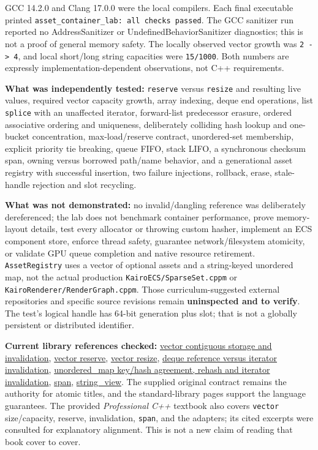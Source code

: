 GCC 14.2.0 and Clang 17.0.0 were the local compilers. Each final executable printed \texttt{asset\_container\_lab:\ all\ checks\ passed}. The GCC sanitizer run reported no AddressSanitizer or UndefinedBehaviorSanitizer diagnostics; this is not a proof of general memory safety. The locally observed vector growth was \texttt{2\ -\textgreater{}\ 4}, and local short/long string capacities were \texttt{15/1000}. Both numbers are expressly implementation-dependent observations, not C++ requirements.

\textbf{What was independently tested:} \texttt{reserve} versus \texttt{resize} and resulting live values, required vector capacity growth, array indexing, deque end operations, list \texttt{splice} with an unaffected iterator, forward-list predecessor erasure, ordered associative ordering and uniqueness, deliberately colliding hash lookup and one-bucket concentration, max-load/reserve contract, unordered-set membership, explicit priority tie breaking, queue FIFO, stack LIFO, a synchronous checksum span, owning versus borrowed path/name behavior, and a generational asset registry with successful insertion, two failure injections, rollback, erase, stale-handle rejection and slot recycling.

\textbf{What was not demonstrated:} no invalid/dangling reference was deliberately dereferenced; the lab does not benchmark container performance, prove memory-layout details, test every allocator or throwing custom hasher, implement an ECS component store, enforce thread safety, guarantee network/filesystem atomicity, or validate GPU queue completion and native resource retirement. \texttt{AssetRegistry} uses a vector of optional assets and a string-keyed unordered map, not the actual production \texttt{KairoECS/SparseSet.cppm} or \texttt{KairoRenderer/RenderGraph.cppm}. Those curriculum-suggested external repositories and specific source revisions remain \textbf{uninspected and to verify}. The test's logical handle has 64-bit generation plus slot; that is not a globally persistent or distributed identifier.

\textbf{Current library references checked:} \href{https://en.cppreference.com/w/cpp/container/vector}{vector contiguous storage and invalidation}, \href{https://www.cppreference.com/cpp/container/vector/reserve}{vector reserve}, \href{https://www.cppreference.com/cpp/container/vector/resize}{vector resize}, \href{https://en.cppreference.com/w/cpp/container/deque}{deque reference versus iterator invalidation}, \href{https://en.cppreference.com/cpp/container/unordered_map}{unordered\_map key/hash agreement, rehash and iterator invalidation}, \href{https://en.cppreference.com/w/cpp/container/span}{span}, \href{https://en.cppreference.com/w/cpp/string/basic_string_view}{string\_view}. The supplied original contract remains the authority for atomic titles, and the standard-library pages support the language guarantees. The provided \emph{Professional C++} textbook also covers \texttt{vector} size/capacity, reserve, invalidation, \texttt{span}, and the adapters; its cited excerpts were consulted for explanatory alignment. This is not a new claim of reading that book cover to cover.

